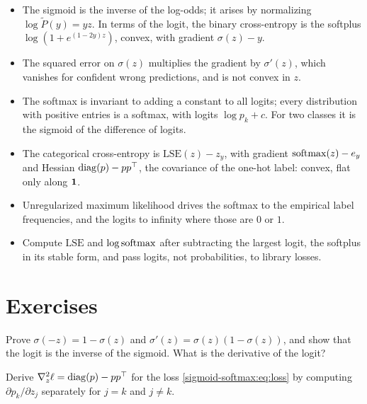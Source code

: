 \begin{notechapter}
\begin{chaptersummary}
\begin{itemize}[nosep]
  \item The sigmoid is the inverse of the log-odds; it arises by normalizing
        $\log\tilde P(y) = yz$. In terms of the logit, the binary cross-entropy is the
        softplus $\log(1 + e^{(1-2y)z})$, convex, with gradient $\sigma(z) - y$.
  \item The squared error on $\sigma(z)$ multiplies the gradient by $\sigma'(z)$, which vanishes for
        confident wrong predictions, and is not convex in $z$.
  \item The softmax is invariant to adding a constant to all logits; every distribution
        with positive entries is a softmax, with logits $\log p_k + c$. For two classes it is
        the sigmoid of the difference of logits.
  \item The categorical cross-entropy is $\mathrm{LSE}(z) - z_y$, with gradient $\operatorname{softmax}(z) - e_y$ and
        Hessian $\operatorname{diag}(p) - pp^\top$, the covariance of the one-hot label: convex, flat only
        along $\mathbf{1}$.
  \item Unregularized maximum likelihood drives the softmax to the empirical label
        frequencies, and the logits to infinity where those are $0$ or $1$.
  \item Compute $\mathrm{LSE}$ and $\log\operatorname{softmax}$ after subtracting the largest logit, the softplus in
        its stable form, and pass logits, not probabilities, to library losses.
\end{itemize}
\end{chaptersummary}

\section*{Exercises}

\begin{exercise}\label{sigmoid-softmax:exr:1}
Prove $\sigma(-z) = 1 - \sigma(z)$ and $\sigma'(z) = \sigma(z)(1 - \sigma(z))$, and show that the logit is the inverse of the
sigmoid. What is the derivative of the logit?
\end{exercise}

\begin{exercise}\label{sigmoid-softmax:exr:2}
Derive $\nabla^2_z\ell = \operatorname{diag}(p) - pp^\top$ for the loss \eqref{sigmoid-softmax:eq:loss} by computing
$\partial p_k/\partial z_j$ separately for $j = k$ and $j\neq k$.
\end{exercise}


\end{notechapter}
